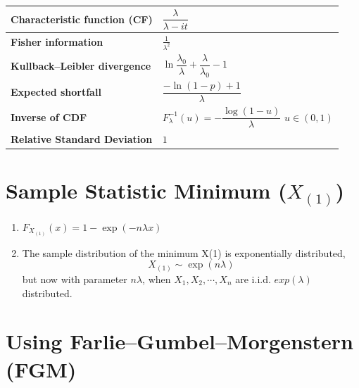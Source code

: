 \begin{customTableWrapper}{2}
\begin{longtable}{|m{6cm}|p{9cm}|}
    \textbf{Characteristic function (CF)} &
    ${ {\dfrac {\lambda }{\lambda -it}}}$
    \\[1ex] \hline

    \textbf{Fisher information} &
    ${ {\frac {1}{\lambda ^{2}}}}$
    \\[1ex] \hline

    \textbf{Kullback–Leibler divergence} &
    ${ \ln {\dfrac {\lambda _{0}}{\lambda }}+{\dfrac {\lambda }{\lambda _{0}}}-1}$
    \\[1ex] \hline

    \textbf{Expected shortfall} &
    ${ {\dfrac {-\ln(1-p)+1}{\lambda }}}$
    \\[1ex] \hline

    \textbf{Inverse of CDF \cite{ism-1}} &
    $F_\lambda^{-1}(u) = -\dfrac{\log(1-u)}{\lambda}$ $u \in (0,1)$
    \\[1ex] \hline

    \textbf{Relative Standard Deviation} &
    $1$
    \\[1ex] \hline

\end{longtable}
\end{customTableWrapper}


\section{Sample Statistic Minimum ($X_{(1)}$) \cite{ism-1}} \label{Exponential Distribution: Sample Statistic Minimum}

\begin{enumerate}
    \item $F_{X_{(1)}}(x) = 1 - \exp(-n\lambda x)$

    \item The sample distribution of the minimum X(1) is exponentially distributed, 
    \[
        X_{(1)} \sim \exp(n\lambda)
    \]
    but now with parameter $n\lambda$, when $X_1,X_2,\cdots, X_n$ are i.i.d. $exp(\lambda)$ distributed.
    
\end{enumerate}


\section{Using Farlie–Gumbel–Morgenstern (FGM) \cite{ism-1}} \label{Sample Statistic Minimum: Using Farlie–Gumbel–Morgenstern (FGM)}

